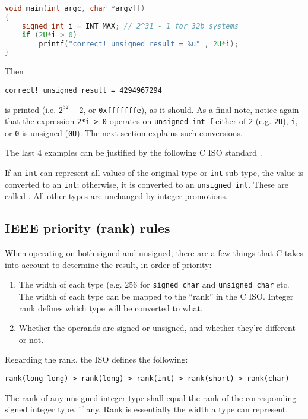 \begin{exmp}
\begin{exmp}
\begin{lstlisting}[language=c]
void main(int argc, char *argv[])
{
	signed int i = INT_MAX; // 2^31 - 1 for 32b systems
	if (2U*i > 0)
		printf("correct! unsigned result = %u" , 2U*i);
}
\end{lstlisting}
\end{exmp}
Then
\begin{verbatim}
correct! unsigned result = 4294967294   
\end{verbatim}
is printed (i.e. $2^{32}-2$, or \texttt{0xfffffffe}), as it should. As a final note, notice again that the expression \texttt{2*i > 0} operates on \texttt{unsigned int} if either of \texttt{2} (e.g. \texttt{2U}), \texttt{i}, or \texttt{0} is unsigned (\texttt{0U}). The next section explains such conversions.\qedblack
\end{exmp}
The last 4 examples can be justified by the following C ISO standard \cite{ciso2007}.
\begin{takeaway}
If an \textup{\texttt{int}} can represent all values of the original type or \textup{\texttt{int}} sub-type, the value is converted to an \textup{\texttt{int}}; otherwise, it is converted to an \textup{\texttt{unsigned int}}. These are called . All other types are unchanged by integer promotions. 
\end{takeaway}




\subsection{IEEE priority (rank) rules}


When operating on both signed and unsigned, there are a few things that C takes into account to determine the result, in order of priority:
\begin{enumerate}
    \item The width of each type (e.g. 256 for \texttt{signed char} and \texttt{unsigned char} etc. The width of each type can be mapped to the ``rank'' in the C ISO. Integer rank defines which type will be converted to what.
    \item Whether the operands are signed or unsigned, and whether they're different or not.
\end{enumerate}
Regarding the rank, the ISO\cite{ciso2007} defines the following:
\begin{takeaway}
\begin{lstlisting}
rank(long long) > rank(long) > rank(int) > rank(short) > rank(char)
\end{lstlisting}
The rank of any unsigned integer type shall equal the rank of the corresponding
signed integer type, if any. Rank is essentially the width a type can represent.
\end{takeaway}

